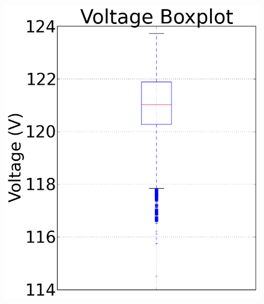 \documentclass[10pt]{sensys-proc}
\begin{document}
\begin{figure}[t!]
{                                                     \includegraphics[scale=0.13]{./figures/us_voltage_box.png}}
              \vspace{-4mm}
               \hspace{-2mm}
             \newline      
                  

\end{figure}
\end{document}
